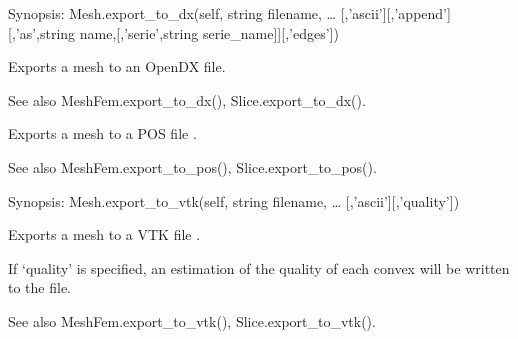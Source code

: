 \documentclass[a4paper,11pt,english]{sphinxmanual}
\begin{document}
\begin{fulllineitems}
\begin{fulllineitems}
\end{fulllineitems}


\begin{fulllineitems}
\label{\detokenize{python/cmdref_Mesh:getfem.Mesh.export_to_dx}}
Synopsis: Mesh.export\_to\_dx(self, string filename, … {[},’ascii’{]}{[},’append’{]}{[},’as’,string name,{[},’serie’,string serie\_name{]}{]}{[},’edges’{]})

Exports a mesh to an OpenDX file.

See also MeshFem.export\_to\_dx(), Slice.export\_to\_dx().

\end{fulllineitems}


\begin{fulllineitems}
\label{\detokenize{python/cmdref_Mesh:getfem.Mesh.export_to_pos}}
Exports a mesh to a POS file .

See also MeshFem.export\_to\_pos(), Slice.export\_to\_pos().

\end{fulllineitems}


\begin{fulllineitems}
\label{\detokenize{python/cmdref_Mesh:getfem.Mesh.export_to_vtk}}
Synopsis: Mesh.export\_to\_vtk(self, string filename, … {[},’ascii’{]}{[},’quality’{]})

Exports a mesh to a VTK file .

If ‘quality’ is specified, an estimation of the quality of each
convex will be written to the file.

See also MeshFem.export\_to\_vtk(), Slice.export\_to\_vtk().

\end{fulllineitems}


\end{fulllineitems}
\end{document}
